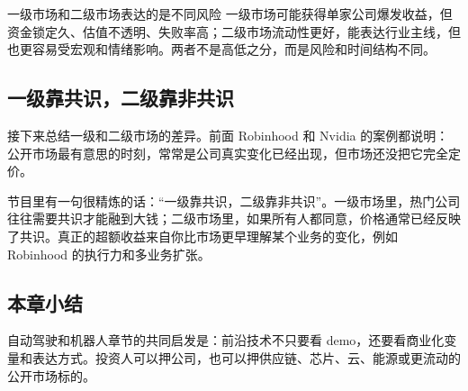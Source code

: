 \begin{warningbox}{一级市场和二级市场表达的是不同风险}
一级市场可能获得单家公司爆发收益，但资金锁定久、估值不透明、失败率高；二级市场流动性更好，能表达行业主线，但也更容易受宏观和情绪影响。两者不是高低之分，而是风险和时间结构不同。
\end{warningbox}

\subsection{一级靠共识，二级靠非共识}

接下来总结一级和二级市场的差异。前面 Robinhood 和 Nvidia 的案例都说明：公开市场最有意思的时刻，常常是公司真实变化已经出现，但市场还没把它完全定价。

节目里有一句很精炼的话：“一级靠共识，二级靠非共识”。一级市场里，热门公司往往需要共识才能融到大钱；二级市场里，如果所有人都同意，价格通常已经反映了共识。真正的超额收益来自你比市场更早理解某个业务的变化，例如 Robinhood 的执行力和多业务扩张。

\subsection{本章小结}

自动驾驶和机器人章节的共同启发是：前沿技术不只要看 demo，还要看商业化变量和表达方式。投资人可以押公司，也可以押供应链、芯片、云、能源或更流动的公开市场标的。

